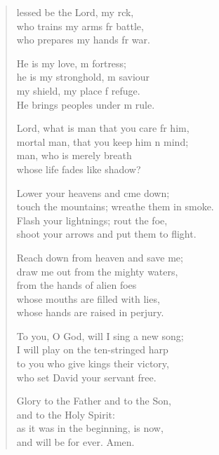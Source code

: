 \begin{verse}
  \begin{patverse}
lessed be the Lord, my rck,\Flex\\
who trains my arms fr battle,\Med\\
who prepares my hands fr war.

He is my love, m fortress;\Med\\
he is my stronghold, m saviour\\
my shield, my place f refuge.\Med\\
He brings peoples under m rule.

Lord, what is man that you care fr him,\Med\\
mortal man, that you keep him n mind;\\
man, who is merely  breath\Med\\
whose life fades like  shadow?

Lower your heavens and cme down;\Med\\
touch the mountains; wreathe them in smoke.\\
Flash your lightnings; rout the foe,\Med\\
shoot your arrows and put them to flight.

Reach down from heaven and save me;\Med\\
draw me out from the mighty waters,\\
from the hands of alien foes\Flex\\
whose mouths are filled with lies,\Med\\
whose hands are raised in perjury.

To you, O God, will I sing a new song;\Med\\
I will play on the ten-stringed harp\\
to you who give kings their victory,\Med\\
who set David your servant free.

Glory to the Father and to the Son,\Med\\
and to the Holy Spirit:\\
as it was in the beginning, is now,\Med\\
and will be for ever. Amen.
  \end{patverse}
\end{verse}


